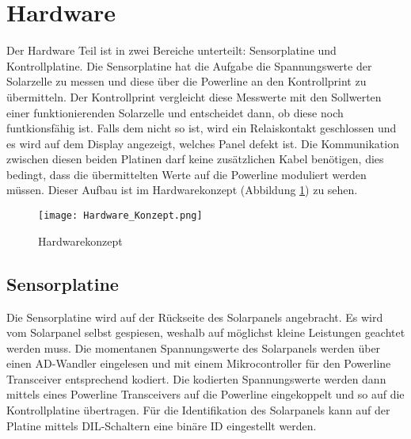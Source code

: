 %
%
%

\section{Hardware}

Der Hardware Teil ist in zwei Bereiche unterteilt: Sensorplatine und Kontrollplatine. Die Sensorplatine hat die Aufgabe die Spannungswerte der Solarzelle zu messen und diese über die Powerline an den Kontrollprint zu übermitteln.
Der Kontrollprint vergleicht diese Messwerte mit den Sollwerten einer funktionierenden Solarzelle und entscheidet dann, ob diese noch funtkionsfähig ist. Falls dem nicht so ist, wird ein Relaiskontakt geschlossen und es wird auf dem Display angezeigt, welches Panel defekt ist. 
Die Kommunikation zwischen diesen beiden Platinen darf keine zusätzlichen Kabel benötigen, dies bedingt, dass die übermittelten Werte auf die Powerline moduliert werden müssen. Dieser Aufbau ist im Hardwarekonzept (Abbildung \ref{fig::Hardwarekonzept}) zu sehen.

\begin{figure}[h]
\centering
\texttt{[image: Hardware\_Konzept.png]}%
\caption{Hardwarekonzept}
\label{fig::Hardwarekonzept}%
\end{figure}

\subsection{Sensorplatine}


Die Sensorplatine wird auf der Rückseite des Solarpanels angebracht. Es wird vom Solarpanel selbst gespiesen, weshalb auf möglichst kleine Leistungen geachtet werden muss. Die momentanen Spannungswerte des Solarpanels werden über einen AD-Wandler eingelesen und mit einem Mikrocontroller für den Powerline Transceiver entsprechend kodiert. Die kodierten Spannungswerte werden dann mittels eines Powerline Transceivers auf die Powerline eingekoppelt und so auf die Kontrollplatine übertragen. Für die Identifikation des Solarpanels kann auf der Platine mittels DIL-Schaltern eine binäre ID eingestellt werden.

